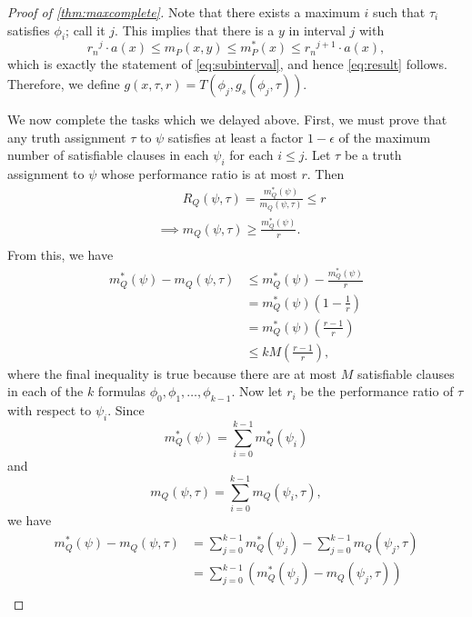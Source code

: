 \documentclass[]{article}
\theoremstyle{plain}
\theoremstyle{definition}
\begin{document}
\begin{proof}[Proof of \autoref{thm:maxcomplete}]
  Note that there exists a maximum $i$ such that $\tau_i$ satisfies $\phi_i$; call it $j$.
  This implies that there is a $y$ in interval $j$ with
  \begin{equation*}
    {r_n}^j \cdot a(x) \leq m_P(x, y) \leq m^*_P(x) \leq {r_n}^{j + 1} \cdot a(x),
  \end{equation*}
  which is exactly the statement of \autoref{eq:subinterval}, and hence \autoref{eq:result} follows.
  Therefore, we define $g(x, \tau, r) = T(\phi_j, g_s(\phi_j, \tau))$.

  We now complete the tasks which we delayed above.
  First, we must prove that any truth assignment $\tau$ to $\psi$ satisfies at least a factor $1 - \epsilon$ of the maximum number of satisfiable clauses in each $\psi_i$ for each $i \leq j$.
  Let $\tau$ be a truth assignment to $\psi$ whose performance ratio is at most $r$.
  Then
  \begin{align*}
    & \phantom{\implies} R_Q(\psi, \tau) = \frac{m^*_Q(\psi)}{m_Q(\psi, \tau)} \leq r \\
    & \implies m_Q(\psi, \tau) \geq \frac{m^*_Q(\psi)}{r}. \\
  \end{align*}
  From this, we have
  \begin{align*}
    m^*_Q(\psi) - m_Q(\psi, \tau) & \leq m^*_Q(\psi) - \frac{m^*_Q(\psi)}{r} \\
    & = m^*_Q(\psi) \left(1 - \frac{1}{r}\right) \\
    & = m^*_Q(\psi) \left(\frac{r - 1}{r}\right)\\
    & \leq kM \left(\frac{r - 1}{r}\right),
  \end{align*}
  where the final inequality is true because there are at most $M$ satisfiable clauses in each of the $k$ formulas $\phi_0, \phi_1, \dotsc, \phi_{k - 1}$.
  Now let $r_i$ be the performance ratio of $\tau$ with respect to $\psi_i$.
  Since
  \begin{equation*}
    m_Q^*(\psi) = \sum_{i = 0}^{k - 1}{m_Q^*(\psi_i)}
  \end{equation*}
  and
  \begin{equation*}
    m_Q(\psi, \tau) = \sum_{i = 0}^{k - 1}{m_Q(\psi_i, \tau)},
  \end{equation*}
  we have
  \begin{align*}
    m^*_Q(\psi) - m_Q(\psi, \tau) & = \sum_{j = 0}^{k - 1}{m_Q^*(\psi_j)} - \sum_{j = 0}^{k - 1}{m_Q(\psi_j, \tau)} \\
    & = \sum_{j = 0}^{k - 1}{\left(m_Q^*(\psi_j) - m_Q(\psi_j, \tau)\right)} \\

\end{align*}
\end{proof}
\end{document}
